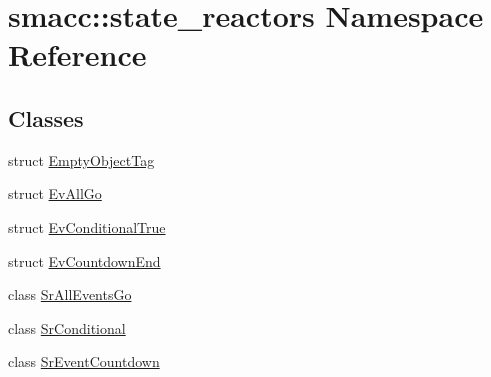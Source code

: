 \hypertarget{namespacesmacc_1_1state__reactors}{}\section{smacc\+:\+:state\+\_\+reactors Namespace Reference}
\label{namespacesmacc_1_1state__reactors}
\subsection*{Classes}
\begin{DoxyCompactItemize}
\item 
struct \hyperlink{structsmacc_1_1state__reactors_1_1EmptyObjectTag}{Empty\+Object\+Tag}
\item 
struct \hyperlink{structsmacc_1_1state__reactors_1_1EvAllGo}{Ev\+All\+Go}
\item 
struct \hyperlink{structsmacc_1_1state__reactors_1_1EvConditionalTrue}{Ev\+Conditional\+True}
\item 
struct \hyperlink{structsmacc_1_1state__reactors_1_1EvCountdownEnd}{Ev\+Countdown\+End}
\item 
class \hyperlink{classsmacc_1_1state__reactors_1_1SrAllEventsGo}{Sr\+All\+Events\+Go}
\item 
class \hyperlink{classsmacc_1_1state__reactors_1_1SrConditional}{Sr\+Conditional}
\item 
class \hyperlink{classsmacc_1_1state__reactors_1_1SrEventCountdown}{Sr\+Event\+Countdown}
\end{DoxyCompactItemize}
